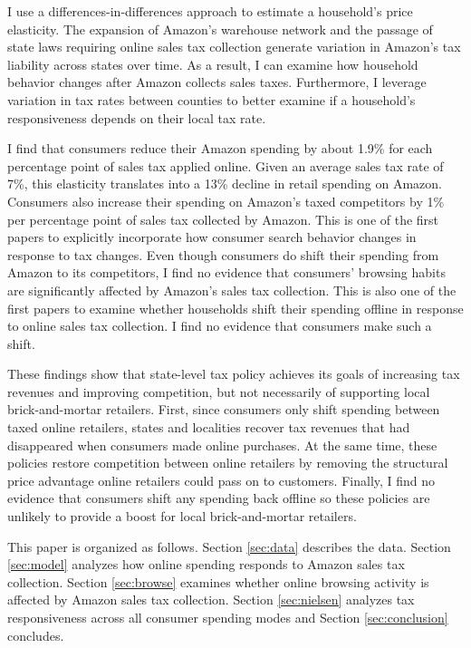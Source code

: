 \documentclass[AEJ,reviewmode]{AEA}
\begin{document}


I use a differences-in-differences approach to estimate a household's price elasticity. The expansion of Amazon's warehouse network and the passage of state laws requiring online sales tax collection generate variation in Amazon's tax liability across states over time. As a result, I can examine how household behavior changes after Amazon collects sales taxes. Furthermore, I leverage variation in tax rates between counties to better examine if a household's responsiveness depends on their local tax rate.

I find that consumers reduce their Amazon spending by about 1.9\% for each percentage point of sales tax applied online. Given an average sales tax rate of 7\%, this elasticity translates into a 13\% decline in retail spending on Amazon. Consumers also increase their spending on Amazon's taxed competitors by 1\% per percentage point of sales tax collected by Amazon. This is one of the first papers to explicitly incorporate how consumer search behavior changes in response to tax changes. Even though consumers do shift their spending from Amazon to its competitors, I find no evidence that consumers' browsing habits are significantly affected by Amazon's sales tax collection. This is also one of the first papers to examine whether households shift their spending offline in response to online sales tax collection. I find no evidence that consumers make such a shift.

These findings show that state-level tax policy achieves its goals of increasing tax revenues and improving competition, but not necessarily of supporting local brick-and-mortar retailers. First, since consumers only shift spending between taxed online retailers, states and localities recover tax revenues that had disappeared when consumers made online purchases. At the same time, these policies restore competition between online retailers by removing the structural price advantage online retailers could pass on to customers. Finally, I find no evidence that consumers shift any spending back offline so these policies are unlikely to provide a boost for local brick-and-mortar retailers.

This paper is organized as follows. Section \ref{sec:data} describes the data. Section \ref{sec:model} analyzes how online spending responds to Amazon sales tax collection. Section \ref{sec:browse} examines whether online browsing activity is affected by Amazon sales tax collection. Section \ref{sec:nielsen} analyzes tax responsiveness across all consumer spending modes and Section \ref{sec:conclusion} concludes.
\end{document}
